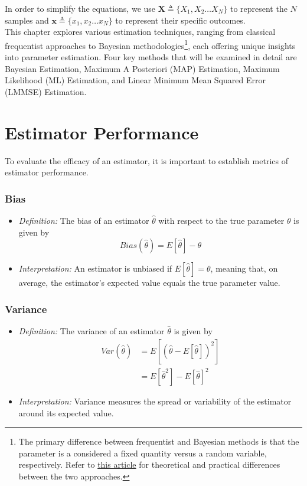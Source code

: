 \documentclass[12pt]{book}
\theoremstyle{definition}
\begin{document}
In order to simplify the equations, we use \(\mathbf{X} \triangleq \{X_1, X_2 \ldots X_N\}\) to represent the \(N\) samples and \(\mathbf{x} \triangleq \{x_1, x_2 \ldots x_N\}\) to represent their specific outcomes.\\

This chapter explores various estimation techniques, ranging from classical frequentist approaches to Bayesian methodologies\footnote{The primary difference between frequentist 
 and Bayesian methods is that the parameter is a considered a fixed quantity versus a random variable, respectively. Refer to \hyperlink{https://towardsdatascience.com/statistics-are-you-bayesian-or-frequentist-4943f953f21b}{this article}{ for theoretical and practical differences between the two approaches.}}, each offering unique insights into parameter estimation. Four key methods that will be examined in detail are Bayesian Estimation, Maximum A Posteriori (MAP) Estimation,  Maximum Likelihood (ML) Estimation, and Linear Minimum Mean Squared Error (LMMSE) Estimation.


\section{Estimator Performance}
To evaluate the efficacy of an estimator, it is important to establish metrics of estimator performance.\\


\subsubsection*{Bias}
    \begin{itemize}
        \item \emph{Definition: }The bias of an estimator \(\hat{\theta}\) with respect to the true parameter \(\theta\) is given by 
        \[
        Bias(\hat{\theta}) = E[\hat{\theta}] - \theta
        \]
        \item \emph{Interpretation: } An estimator is unbiased if \(E[\hat{\theta}] = \theta\), meaning that, on average, the estimator's expected value equals the true parameter value.
    \end{itemize}
   
\subsubsection*{Variance}
\begin{itemize}
    \item \emph{Definition: } The variance of an estimator \(\hat{\theta}\) is given by 
    \[
    \begin{aligned}
        Var(\hat{\theta}) & = E[(\hat{\theta} - E[\hat{\theta}])^2]\\
            & = E[\hat{\theta}^2] - E[\hat{\theta}]^2
    \end{aligned}
    \]
    
   \item \emph{Interpretation: } Variance measures the spread or variability of the estimator around its expected value.
\end{itemize}
\end{document}

